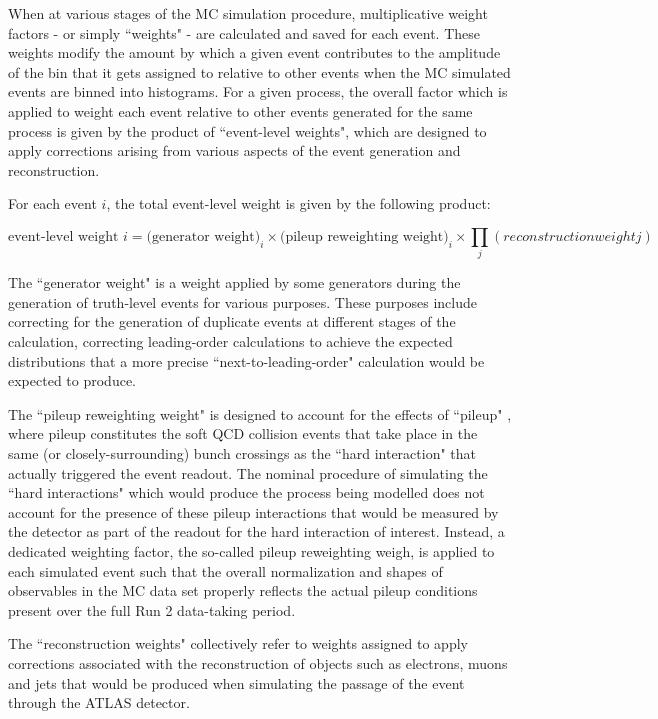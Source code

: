 When at various stages of the MC simulation procedure, multiplicative weight factors - or simply ``weights" - are calculated and saved for each event. These weights modify the amount by which a given event contributes to the amplitude of the bin that it gets assigned to relative to other events when the MC simulated events are binned into histograms. For a given process, the overall factor which is applied to weight each event relative to other events generated for the same process is given by the product of ``event-level weights", which are designed to apply corrections arising from various aspects of the event generation and reconstruction. 

For each event $i$, the total event-level weight is given by the following product:

\begin{equation}
\label{eq:evt_wt}
\text{event-level weight }i = \text{(generator weight)}_i \times \text{(pileup reweighting weight)}_i \times \prod_j (reconstruction weight j)
\end{equation}

The ``generator weight" is a weight applied by some generators during the generation of truth-level events for various purposes. These purposes include correcting for the generation of duplicate events at different stages of the calculation, correcting leading-order calculations to achieve the expected distributions that a more precise ``next-to-leading-order" calculation would be expected to produce. 

The ``pileup reweighting weight" is designed to account for the effects of ``pileup" \cite{pileup}, where pileup constitutes the soft QCD collision events that take place in the same (or closely-surrounding) bunch crossings as the ``hard interaction" that actually triggered the event readout. The nominal procedure of simulating the ``hard interactions" which would produce the process being modelled does not account for the presence of these pileup interactions that would be measured by the detector as part of the readout for the hard interaction of interest. Instead, a dedicated weighting factor, the so-called pileup reweighting weigh, is applied to each simulated event such that the overall normalization and shapes of observables in the MC data set properly reflects the actual pileup conditions present over the full Run 2 data-taking period.

The ``reconstruction weights" collectively refer to weights assigned to apply corrections associated with the reconstruction of objects such as electrons, muons and jets that would be produced when simulating the passage of the event through the ATLAS detector.

